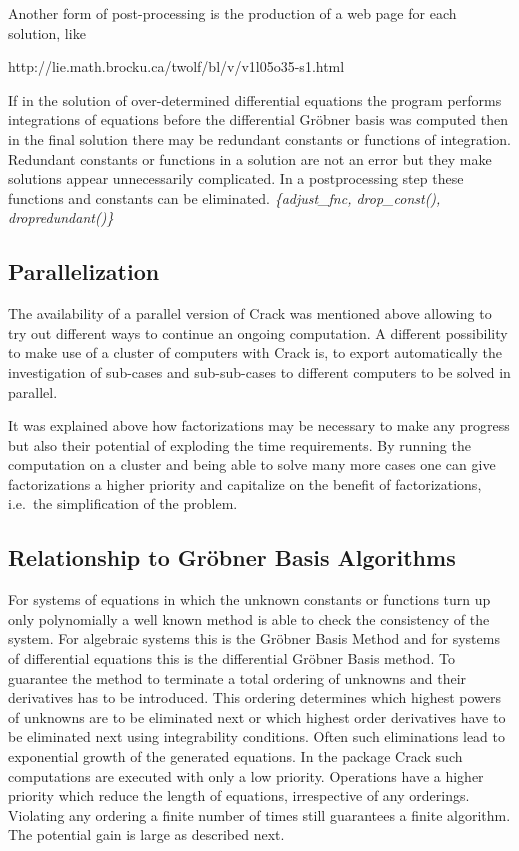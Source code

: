 \documentclass[12pt]{article}
\begin{document}
  Another form of post-processing is the production of 
  a web page for each solution, like 
           http://lie.math.brocku.ca/twolf/bl/v/v1l05o35-s1.html

  If in the solution of over-determined differential equations the
  program performs integrations of equations before the differential
  Gr\"{o}bner basis was computed then in the final solution there may
  be redundant constants or functions of integration. 
  Redundant constants or functions in a solution are not an
  error but they make solutions appear unnecessarily complicated.
  In a postprocessing step these functions and constants can be eliminated.
  {\em \{adjust\_fnc, drop\_const(), dropredundant()\} } 

\subsection{Parallelization}
  The availability of a parallel version of {\sc Crack} was mentioned
  above allowing to try out different ways to continue an ongoing
  computation. A different possibility to make use of a cluster of
  computers with {\sc Crack} is, to export automatically the
  investigation of sub-cases and sub-sub-cases to different computers
  to be solved in parallel.
  
  It was explained above how factorizations may be necessary to make
  any progress but also their potential of exploding the time requirements.
  By running the computation on a cluster and
  being able to solve many more cases one can give factorizations a
  higher priority and capitalize on the benefit of factorizations,
  i.e.\ the simplification of the problem.

\subsection{Relationship to Gr\"{o}bner Basis Algorithms}
  For systems of equations in which the unknown constants or functions
  turn up only polynomially a well known method is able to check the
  consistency of the system. For algebraic systems this is the
  Gr\"{o}bner Basis Method and for systems of differential equations
  this is the differential Gr\"{o}bner Basis method. To guarantee the
  method to terminate a total ordering of unknowns and their
  derivatives has to be introduced. This ordering determines which
  highest powers of unknowns are to be eliminated next or which
  highest order derivatives have to be eliminated next using integrability
  conditions. Often such eliminations lead to exponential growth of
  the generated equations. In the package {\sc Crack} such
  computations are executed with only a low priority. Operations have 
  a higher priority which reduce the length of equations,
  irrespective of any orderings. Violating any ordering a finite
  number of times still guarantees a finite algorithm. The potential
  gain is large as described next.
\end{document}
